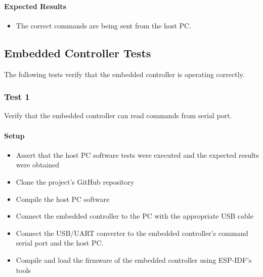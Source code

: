 \documentclass[10pt,twocolumn,letterpaper]{article}
\begin{document}
\paragraph{Expected Results}

\begin{itemize}
  \item The correct commands are being sent from the host PC.
\end{itemize}

\subsection{Embedded Controller Tests}

The following tests verify that the embedded controller is operating correctly.

\subsubsection{Test 1}

Verify that the embedded controller can read commands from serial port.

\paragraph{Setup}
\begin{itemize}
  \item Assert that the host PC software tests were executed and the expected results were obtained
  \item Clone the project's GitHub repository \cite{mygit}
  \item Compile the host PC software
  \item Connect the embedded controller to the PC with the appropriate USB cable
  \item Connect the USB/UART converter to the embedded controller's command serial port and the host PC.
  \item Compile and load the firmware of the embedded controller using ESP-IDF's tools
\end{itemize}
\end{document}
